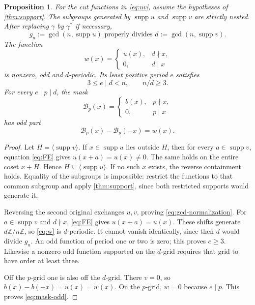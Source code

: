 \documentclass[11pt,a4paper]{amsart}
\numberwithin{equation}{section}
\theoremstyle{plain}
\newtheorem{proposition}[theorem]{Proposition}
\theoremstyle{definition}
\newcommand{\Z}{\mathbb Z}
\newcommand{\supp}{\operatorname{supp}}
\begin{document}
\begin{proposition}\label{prop:normalization}
For the cut functions in \eqref{eq:uv}, assume the hypotheses of
\cref{thm:support}.  The subgroups generated by
\(\supp u\) and \(\supp v\) are strictly nested.  After replacing
\(\gamma\) by \(\gamma^*\) if necessary,
\begin{equation}\label{eq:gcd-normalization}
g_u:=\gcd(n,\supp u)\text{ properly divides }
 d:=\gcd(n,\supp v).
\end{equation}
The function
\begin{equation}\label{eq:w}
w(x)=\begin{cases}u(x),&d\nmid x,\\0,&d\mid x\end{cases}
\end{equation}
is nonzero, odd and \(d\)-periodic.  Its least positive period \(e\) satisfies
\begin{equation}\label{eq:basic-periods}
3\le e\mid d<n,\qquad n/d\ge3.
\end{equation}
For every \(e\mid p\mid d\), the mask
\begin{equation}\label{eq:mask}
\mathcal B_p(x)=\begin{cases}b(x),&p\nmid x,\\0,&p\mid x\end{cases}
\end{equation}
has odd part
\begin{equation}\label{eq:mask-odd}
\mathcal B_p(x)-\mathcal B_p(-x)=w(x).
\end{equation}
\end{proposition}
\begin{proof}
Let \(H=\langle\supp v\rangle\).  If \(x\in\supp u\) lies outside \(H\), then
for every \(a\in\supp v\), equation \eqref{eq:FE} gives
\(u(x+a)=u(x)\ne0\).  The same holds on the entire coset \(x+H\).
Hence \(H\subseteq\langle\supp u\rangle\).  If no such \(x\) exists, the
reverse containment holds.  Equality of the subgroups is impossible:
restrict the functions to that common subgroup and apply
\cref{thm:support}, since both restricted supports would generate it.

Reversing the second original exchanges \(u,v\), proving
\eqref{eq:gcd-normalization}.  For \(a\in\supp v\) and \(d\nmid x\),
\eqref{eq:FE} gives \(u(x+a)=u(x)\).  These shifts generate \(d\Z/n\Z\),
so \eqref{eq:w} is \(d\)-periodic.  It cannot vanish identically, since then
\(d\) would divide \(g_u\).  An odd function of period one or two is zero;
this proves \(e\ge3\).  Likewise a nonzero odd function supported on the
\(d\)-grid requires that grid to have order at least three.

Off the \(p\)-grid one is also off the \(d\)-grid.  There \(v=0\), so
\(b(x)-b(-x)=u(x)=w(x)\).  On the \(p\)-grid, \(w=0\) because \(e\mid p\).
This proves \eqref{eq:mask-odd}.
\end{proof}
\end{document}
